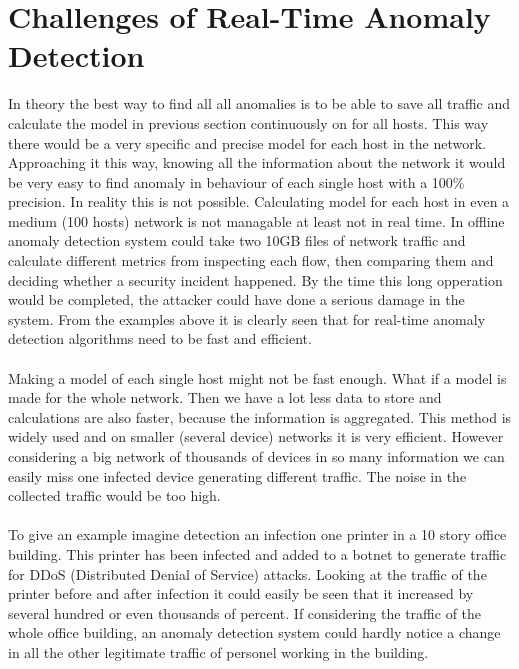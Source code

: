 \documentclass[thesis=B,english]{FITthesis}[2012/10/20]
\begin{document}
\section{Challenges of Real-Time Anomaly Detection}
In theory the best way to find all all anomalies is to be able to save all traffic and calculate the model in previous section continuously on for all hosts.
This way there would be a very specific and precise model for each host in the network.
Approaching it this way, knowing all the information about the network it would be very easy to find anomaly in behaviour of each single host with a 100\% precision.
In reality this is not possible.
Calculating model for each host in even a medium (100 hosts) network is not managable at least not in real time.
In offline anomaly detection system could take two 10GB files of network traffic and calculate different metrics from inspecting each flow, then comparing them and deciding whether a security incident happened.
By the time this long opperation would be completed, the attacker could have done a serious damage in the system.
From the examples above it is clearly seen that for real-time anomaly detection algorithms need to be fast and efficient.
\\ \\
Making a model of each single host might not be fast enough.
What if a model is made for the whole network.
Then we have a lot less data to store and calculations are also faster, because the information is aggregated.
This method is widely used and on smaller (several device) networks it is very efficient.
However considering a big network of thousands of devices in so many information we can easily miss one infected device generating different traffic.
The noise in the collected traffic would be too high.
\\ \\
To give an example imagine detection an infection one printer in a 10 story office building.
This printer has been infected and added to a botnet to generate traffic for DDoS (Distributed Denial of Service) attacks.
Looking at the traffic of the printer before and after infection it could easily be seen that it increased by several hundred or even thousands of percent.
If considering the traffic of the whole office building, an anomaly detection system could hardly notice a change in all the other legitimate traffic of personel working in the building.
\end{document}
